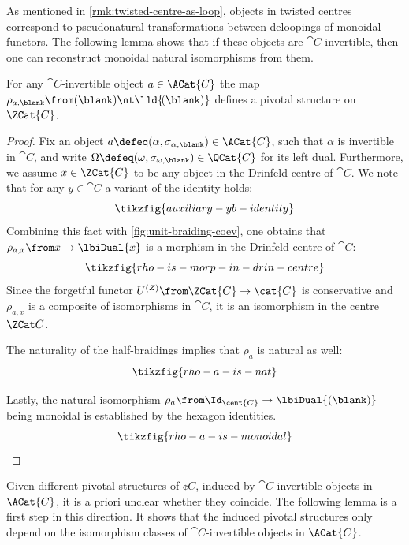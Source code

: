 As mentioned in \cref{rmk:twisted-centre-as-loop},
objects in twisted centres correspond to pseudonatural transformations between deloopings of monoidal functors.
The following lemma
shows that if these objects are \(\cat{C}\)\hyp{}invertible, then
one can reconstruct monoidal natural isomorphisms from them.

\begin{lemma}\label{lem: pivotal_structure_from_entwinement}
  For any \(\cat{C}\)\hyp{}invertible object \(a \in \ACat{C}\)
  the map \(\rho_{a, \blank}\from (\blank) \nt \lld{\!(\blank)}\)
  defines a pivotal structure on \(\ZCat{C}\).
\end{lemma}
\begin{proof}
  Fix an object \(a \defeq (\alpha, \sigma_{\alpha, \blank}) \in \ACat{C}\),
  such that \(\alpha\) is invertible in \(\cat{C}\), and write \(\Omega \defeq (\omega, \sigma_{\omega, \blank}) \in \QCat{C}\) for its left dual.
  Furthermore, we assume \(x \in \ZCat{C}\) to be any object in the Drinfeld centre of \(\cat{C}\).
  We note that for any \(y \in \cat{C}\) a variant of the \YangBaxter{} identity holds:
  \[
    \tikzfig{auxiliary-yb-identity}
  \]
  Combining this fact with \cref{fig:unit-braiding-coev},
  one obtains that \(\rho_{a,x} \from x \to \lbiDual{x}\) is a morphism in the Drinfeld centre of \(\cat{C}\):
  \[
    \tikzfig{rho-is-morp-in-drin-centre}
  \]
  Since the forgetful functor \(U^{(Z)} \from \ZCat{C} \to \cat{C}\) is conservative
  and \(\rho_{a, x}\) is a composite of isomorphisms in \(\cat{C}\),
  it is an isomorphism in the centre \(\ZCat C\).

  The naturality of the half-braidings implies that \(\rho_{a}\) is natural as well:
  \[
    \tikzfig{rho-a-is-nat}
  \]

  Lastly, the natural isomorphism \(\rho_a \from \Id_{\cent{C}} \to \lbiDual{(\blank)}\) being monoidal is established by the hexagon identities.
  \[
    \tikzfig{rho-a-is-monoidal}
  \]
\end{proof}

Given different pivotal structures of \(\cent{C}\),
induced by \(\cat{C}\)\hyp{}invertible objects in \(\ACat{C}\),
it is a priori unclear whether they coincide.
The following lemma is a first step in this direction.
It shows that the induced pivotal structures only depend on the isomorphism classes of \(\cat{C}\)\hyp{}invertible objects in \(\ACat{C}\).

